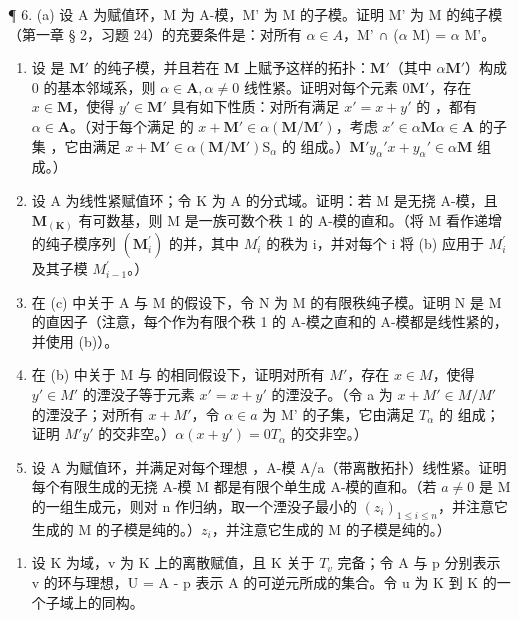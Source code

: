 ¶ 6. (a) 设 A 为赋值环，M 为 A-模，M' 为 M 的子模。证明 M' 为 M 的纯子模（第一章 § 2，习题 24）的充要条件是：对所有 \(\alpha \in A\)，M' ∩ (\(\alpha\) M) = \(\alpha\) M'。

\begin{enumerate}
\def\labelenumi{(\alph{enumi})}
\setcounter{enumi}{1}
\item
  设  是 \(\mathbf{M}'\) 的纯子模，并且若在 \(\mathbf{M}\) 上赋予这样的拓扑：\(\mathbf{M}'\)（其中 \(\alpha\mathbf{M}'\)）构成 0 的基本邻域系，则 \(\alpha \in \mathbf{A}, \alpha \neq 0\) 线性紧。证明对每个元素 \(0\)\(\mathbf{M}'\)，存在 \(x \in \mathbf{M}\)，使得 \(y' \in \mathbf{M}'\) 具有如下性质：对所有满足 \(x' = x + y'\) 的 ，都有 \(\alpha \in \mathbf{A}\)。（对于每个满足  的 \(x + \mathbf{M}' \in \alpha(\mathbf{M} / \mathbf{M}')\)，考虑 \(x' \in \alpha\mathbf{M}\)\(\alpha \in \mathbf{A}\) 的子集 ，它由满足 \(x + \mathbf{M}' \in \alpha(\mathbf{M} / \mathbf{M}')\)\(\mathrm{S}_{\alpha}\) 的  组成。）\(\mathbf{M}'\)\(y_{\alpha}'\)\(x + y_{\alpha}' \in \alpha\mathbf{M}\) 组成。）
\item
  设 A 为线性紧赋值环；令 K 为 A 的分式域。证明：若 M 是无挠 A-模，且 \(\mathbf{M}_{(\mathbf{K})}\) 有可数基，则 M 是一族可数个秩 1 的 A-模的直和。（将 M 看作递增的纯子模序列 \((\mathbf{M}_{i}^{\prime})\) 的并，其中 \(M_{i}^{\prime}\) 的秩为 i，并对每个 i 将 (b) 应用于 \(M_{i}^{\prime}\) 及其子模 \(M_{i-1}^{\prime}\)。）
\item
  在 (c) 中关于 A 与 M 的假设下，令 N 为 M 的有限秩纯子模。证明 N 是 M 的直因子（注意，每个作为有限个秩 1 的 A-模之直和的 A-模都是线性紧的，并使用 (b)）。
\item
  在 (b) 中关于 M 与  的相同假设下，证明对所有 \(M'\)，存在 \(x \in M\)，使得 \(y' \in M'\) 的湮没子等于元素 \(x' = x + y'\) 的湮没子。（令 a 为 \(x + M' \in M/M'\) 的湮没子；对所有 \(x + M'\)，令 \(\alpha \in a\) 为 M' 的子集，它由满足 \(T_{\alpha}\) 的  组成；证明 \(M'\)\(y'\) 的交非空。）\(\alpha(x + y') = 0\)\(T_{\alpha}\) 的交非空。）
\item
  设 A 为赋值环，并满足对每个理想 ，A-模 A/a（带离散拓扑）线性紧。证明每个有限生成的无挠 A-模 M 都是有限个单生成 A-模的直和。（若 \(a \neq 0\) 是 M 的一组生成元，则对 n 作归纳，取一个湮没子最小的 \((z_{i})_{1 \leqslant i \leqslant n}\)，并注意它生成的 M 的子模是纯的。）\(z_{i}\)，并注意它生成的 M 的子模是纯的。）
\end{enumerate}

\begin{enumerate}
\def\labelenumi{\arabic{enumi}.}
\setcounter{enumi}{6}
\tightlist
\item
  设 K 为域，v 为 K 上的离散赋值，且 K 关于 \(T_{v}\) 完备；令 A 与 p 分别表示 v 的环与理想，U = A - p 表示 A 的可逆元所成的集合。令 u 为 K 到 K 的一个子域上的同构。
\end{enumerate}

